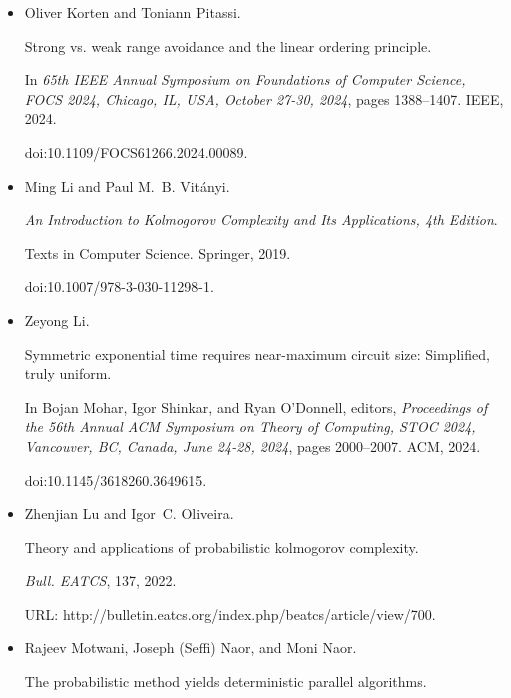 \begin{itemize}
\item[] 
[21]

Oliver Korten and Toniann Pitassi.


Strong vs. weak range avoidance and the linear ordering principle.


In \emph{65th IEEE Annual Symposium on Foundations of Computer
Science, FOCS 2024, Chicago, IL, USA, October 27-30, 2024}, pages
1388–1407. IEEE, 2024.


doi:10.1109/FOCS61266.2024.00089.





\item[] 
[22]

Ming Li and Paul M. B. Vitányi.


\emph{An Introduction to Kolmogorov Complexity and Its Applications,
4th Edition}.


Texts in Computer Science. Springer, 2019.


doi:10.1007/978-3-030-11298-1.





\item[] 
[23]

Zeyong Li.


Symmetric exponential time requires near-maximum circuit size:
Simplified, truly uniform.


In Bojan Mohar, Igor Shinkar, and Ryan O’Donnell, editors, \emph{Proceedings of the 56th Annual ACM Symposium on Theory of Computing, STOC
2024, Vancouver, BC, Canada, June 24-28, 2024}, pages 2000–2007. ACM,
2024.


doi:10.1145/3618260.3649615.





\item[] 
[24]

Zhenjian Lu and Igor C. Oliveira.


Theory and applications of probabilistic kolmogorov complexity.


\emph{Bull. EATCS}, 137, 2022.


URL:
http://bulletin.eatcs.org/index.php/beatcs/article/view/700.





\item[] 
[25]

Rajeev Motwani, Joseph (Seffi) Naor, and Moni Naor.


The probabilistic method yields deterministic parallel algorithms.



\end{itemize}

